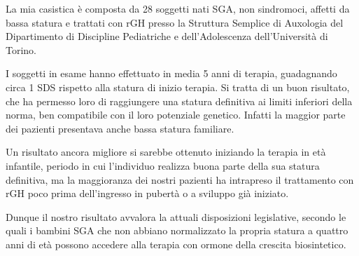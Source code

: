 \documentclass[12pt,a4paper]{article}
\begin{document}
La mia casistica è composta da 28 soggetti nati SGA, non sindromoci, affetti da bassa statura e trattati con rGH presso la Struttura Semplice di Auxologia del Dipartimento di Discipline Pediatriche e dell'Adolescenza dell'Università di Torino.

I soggetti in esame hanno effettuato in media 5 anni di terapia, guadagnando circa 1 SDS rispetto alla statura di inizio terapia. Si tratta di un buon risultato, che ha permesso loro di raggiungere una statura definitiva ai limiti inferiori della norma, ben compatibile con il loro potenziale genetico. Infatti la maggior parte dei pazienti presentava anche bassa statura familiare. 

Un risultato ancora migliore si sarebbe ottenuto iniziando la terapia in età infantile, periodo in cui l'individuo realizza buona parte della sua statura definitiva, ma la maggioranza dei nostri pazienti ha intrapreso il trattamento con rGH poco prima dell'ingresso in pubertà o a sviluppo già iniziato.

Dunque il nostro risultato avvalora la attuali disposizioni legislative, secondo le quali i bambini SGA che non abbiano normalizzato la propria statura a quattro anni di età possono accedere alla terapia con ormone della crescita biosintetico.  



 
\end{document}
